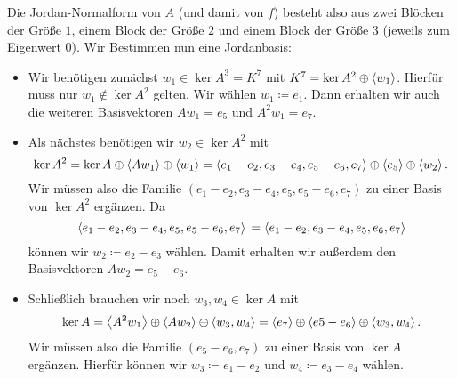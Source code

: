 \begin{example}
  Die Jordan-Normalform von $A$ (und damit von $f$) besteht also aus zwei Blöcken der Größe $1$, einem Block der Größe $2$ und einem Block der Größe $3$ (jeweils zum Eigenwert $0$).
  Wir Bestimmen nun eine Jordanbasis:
  
  \begin{itemize}
    \item
      Wir benötigen zunächst $w_1 \in \ker A^3 = K^7$ mit $K^7 = \ker A^2 \oplus \left\langle w_1 \right\rangle$.
      Hierfür muss nur $w_1 \notin \ker A^2$ gelten.
      Wir wählen $w_1 \coloneqq e_1$.
      Dann erhalten wir auch die weiteren Basisvektoren $A w_1 = e_5$ und $A^2 w_1 = e_7$.
    \item
      Als nächstes benötigen wir $w_2 \in \ker A^2$ mit
      \[
          \ker A^2
        =         \ker A
          \oplus  \left\langle A w_1 \right\rangle
          \oplus  \left\langle w_1 \right\rangle
        =         \left\langle e_1 - e_2, e_3 - e_4, e_5 - e_6, e_7 \right\rangle
          \oplus  \left\langle e_5 \right\rangle
          \oplus  \left\langle w_2 \right\rangle.
      \]
      Wir müssen also die Familie $( e_1 - e_2, e_3 - e_4, e_5, e_5 - e_6, e_7 )$ zu einer Basis von $\ker A^2$ ergänzen.
      Da
      \[
          \left\langle  e_1 - e_2, e_3 - e_4, e_5, e_5 - e_6, e_7  \right\rangle \\
        = \left\langle  e_1 - e_2, e_3 - e_4, e_5, e_6, e_7  \right\rangle
      \]
      können wir $w_2 \coloneqq e_2 - e_3$ wählen.
      Damit erhalten wir außerdem den Basisvektoren $A w_2 = e_5 - e_6$.
    \item
      Schließlich brauchen wir noch $w_3, w_4 \in \ker A$ mit
      \[
          \ker A
        =         \left\langle A^2 w_1 \right\rangle
          \oplus  \left\langle A w_2 \right\rangle
          \oplus  \left\langle w_3, w_4 \right\rangle
        =         \left\langle e_7 \right\rangle
          \oplus  \left\langle e5 - e_6 \right\rangle
          \oplus  \left\langle w_3, w_4 \right\rangle.
      \]
      Wir müssen also die Familie $(e_5 - e_6, e_7)$ zu einer Basis von $\ker A$ ergänzen.
      Hierfür können wir $w_3 \coloneqq e_1 - e_2$ und $w_4 \coloneqq e_3 - e_4$ wählen.
  \end{itemize}


\end{example}
